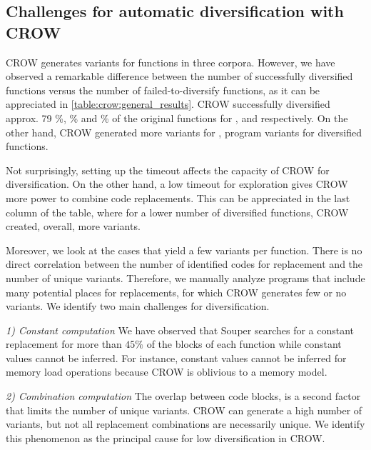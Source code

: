 

\subsection{Challenges for automatic diversification with CROW}



CROW generates variants for functions in three corpora. However, we have observed a remarkable difference between the number of successfully diversified functions versus the number of failed-to-diversify functions, as it can be appreciated in \autoref{table:crow:general_results}. CROW successfully diversified approx. 79 \%, \% and \% of the original functions for \corpusrosetta, \corpussodium and \corpusqrcode respectively. On the other hand, CROW generated more variants for \corpusqrcode, \py{\qrpopulation} program variants for \py{\diversifiedqrcode} diversified functions. 

Not surprisingly, setting up the timeout affects the capacity of CROW for diversification. On the other hand, a low timeout for exploration gives CROW more power to combine code replacements. This can be appreciated in the last column of the table, where for a lower number of diversified functions, CROW created, overall, more variants.

Moreover, we look at the cases that yield a few variants per function. There is no direct correlation between the number of identified codes for replacement and the number of unique variants. Therefore, we manually analyze programs that include many potential places for replacements, for which CROW generates few or no variants. 
We identify two main challenges for diversification.

\emph{1) Constant computation}  We have observed that Souper searches for a constant replacement for more than $45\%$ of the blocks of each function while constant values cannot be inferred. For instance,  constant values cannot be inferred for memory load operations because CROW is oblivious to a memory model. 


\emph{2) Combination computation}  The overlap between code blocks, is a second factor that limits the number of unique variants. CROW can generate a high number of variants, but not all replacement combinations are necessarily unique. We identify this phenomenon as the principal cause for low diversification in CROW. 


